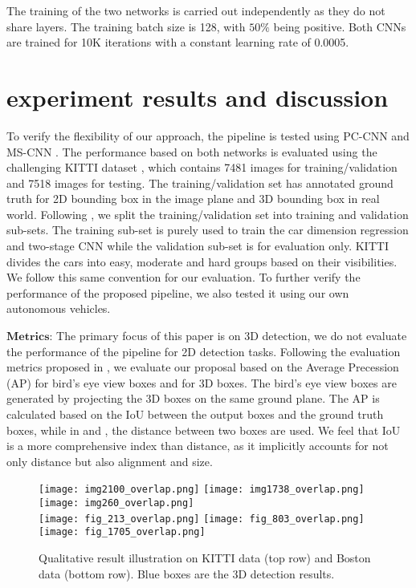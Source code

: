 \documentclass[letterpaper, 10 pt, conference]{ieeeconf}  \usepackage[
\begin{document}
The training of the two networks is carried out independently as they do not share layers. The training batch size is 128, with $50\%$ being positive. Both CNNs are trained for 10K iterations with a constant learning rate of 0.0005.

\section{experiment results and discussion}
\label{sec:experiment results and discussion}
To verify the flexibility of our approach, the pipeline is tested using PC-CNN \cite{du2017iros} and MS-CNN \cite{cai2016unified}. The performance based on both networks is evaluated using the challenging KITTI dataset \cite{Geiger2012CVPR}, which contains 7481 images for training/validation and 7518 images for testing. The training/validation set has annotated ground truth for 2D bounding box in the image plane and 3D bounding box in real world. Following \cite{chen20153d}, we split the training/validation set into training and validation sub-sets. The training sub-set is purely used to train the car dimension regression and two-stage CNN while the validation sub-set is for evaluation only. KITTI divides the cars into easy, moderate and hard groups based on their visibilities. We follow this same convention for our evaluation. To further verify the performance of the proposed pipeline, we also tested it using our own autonomous vehicles.

$\textbf{Metrics:}$ The primary focus of this paper is on 3D detection, we do not evaluate the performance of the pipeline for 2D detection tasks. Following the evaluation metrics proposed in \cite{Chen2017CVPR}, we evaluate our proposal based on the Average Precession (AP) for bird's eye view boxes and for 3D boxes. The bird's eye view boxes are generated by projecting the 3D boxes on the same ground plane. The AP is calculated based on the IoU between the output boxes and the ground truth boxes, while in \cite{xiang2015data} and \cite{deepmanta_cvpr17}, the distance between two boxes are used. We feel that IoU is a more comprehensive index than distance, as it implicitly accounts for not only distance but also alignment and size.

\begin{figure*}[t]
\centering
     \texttt{[image: img2100\_overlap.png]} 
     \texttt{[image: img1738\_overlap.png]}
     \texttt{[image: img260\_overlap.png]}  \\
     \texttt{[image: fig\_213\_overlap.png]} 
     \texttt{[image: fig\_803\_overlap.png]} 
     \texttt{[image: fig\_1705\_overlap.png]} 
    \caption{Qualitative result illustration on KITTI data (top row) and Boston data (bottom row). Blue boxes are the 3D detection results.}
    \label{fig:qualitative results}
\end{figure*}
\end{document}
